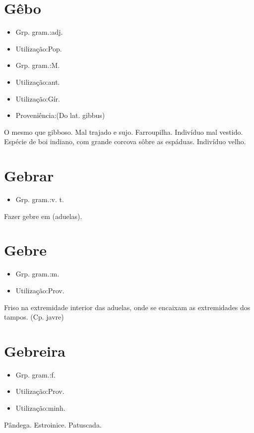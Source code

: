 \section{Gêbo}
\begin{itemize}
\item {Grp. gram.:adj.}
\end{itemize}
\begin{itemize}
\item {Utilização:Pop.}
\end{itemize}
\begin{itemize}
\item {Grp. gram.:M.}
\end{itemize}
\begin{itemize}
\item {Utilização:ant.}
\end{itemize}
\begin{itemize}
\item {Utilização:Gír.}
\end{itemize}
\begin{itemize}
\item {Proveniência:(Do lat. \textunderscore gibbus\textunderscore )}
\end{itemize}
O mesmo que \textunderscore gibboso\textunderscore .
Mal trajado e sujo.
Farroupilha.
Indivíduo mal vestido.
Espécie de boi indiano, com grande corcova sôbre as espáduas.
Indivíduo velho.
\section{Gebrar}
\begin{itemize}
\item {Grp. gram.:v. t.}
\end{itemize}
Fazer gebre em (aduelas).
\section{Gebre}
\begin{itemize}
\item {Grp. gram.:m.}
\end{itemize}
\begin{itemize}
\item {Utilização:Prov.}
\end{itemize}
Friso na extremidade interior das aduelas, onde se encaixam as extremidades dos tampos.
(Cp. \textunderscore javre\textunderscore )
\section{Gebreira}
\begin{itemize}
\item {Grp. gram.:f.}
\end{itemize}
\begin{itemize}
\item {Utilização:Prov.}
\end{itemize}
\begin{itemize}
\item {Utilização:minh.}
\end{itemize}
Pândega.
Estroinice.
Patuscada.
